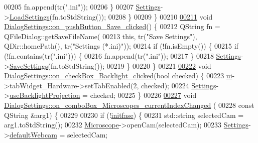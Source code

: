 \begin{DoxyCode}
00205       fn.append(tr(\textcolor{stringliteral}{".ini"}));
00206     \}
00207     \hyperlink{class_dialog_settings_ae6b9e42f9108f93c4964be28a7171648}{Settings}->\hyperlink{class_soil_analyzer_1_1_soil_settings_a438bf660eeb7a49a676eef5da129f8d5}{LoadSettings}(fn.toStdString());
00208   \}
00209 \}
00210 
\hypertarget{dialogsettings_8cpp_source_l00211}{}\hyperlink{class_dialog_settings_a2f04e1b1d30db8197db4de03bea63a87}{00211} \textcolor{keywordtype}{void} \hyperlink{class_dialog_settings_a2f04e1b1d30db8197db4de03bea63a87}{DialogSettings::on\_pushButton\_Save\_clicked}() \{
00212   QString fn = QFileDialog::getSaveFileName(
00213       \textcolor{keyword}{this}, tr(\textcolor{stringliteral}{"Save Settings"}), QDir::homePath(), tr(\textcolor{stringliteral}{"Settings (*.ini)"}));
00214   \textcolor{keywordflow}{if} (!fn.isEmpty()) \{
00215     \textcolor{keywordflow}{if} (!fn.contains(tr(\textcolor{stringliteral}{".ini"}))) \{
00216       fn.append(tr(\textcolor{stringliteral}{".ini"}));
00217     \}
00218     \hyperlink{class_dialog_settings_ae6b9e42f9108f93c4964be28a7171648}{Settings}->\hyperlink{class_soil_analyzer_1_1_soil_settings_ab211c361df454e8e1e29a4bddedeba81}{SaveSettings}(fn.toStdString());
00219   \}
00220 \}
00221 
\hypertarget{dialogsettings_8cpp_source_l00222}{}\hyperlink{class_dialog_settings_a32f4763290f97febfa34bcdcd2dc9432}{00222} \textcolor{keywordtype}{void} \hyperlink{class_dialog_settings_a32f4763290f97febfa34bcdcd2dc9432}{DialogSettings::on\_checkBox\_Backlight\_clicked}(\textcolor{keywordtype}{bool} 
      checked) \{
00223   \hyperlink{class_dialog_settings_a5b53d91a27cdf68f77e4bdd10b6a9bba}{ui}->tabWidget\_Hardware->setTabEnabled(2, checked);
00224   \hyperlink{class_dialog_settings_ae6b9e42f9108f93c4964be28a7171648}{Settings}->\hyperlink{class_soil_analyzer_1_1_soil_settings_a4945fc8b592a2585d3719175e3b80c88}{useBacklightProjection} = checked;
00225 \}
00226 
\hypertarget{dialogsettings_8cpp_source_l00227}{}\hyperlink{class_dialog_settings_adeb3fcea2cf71899e5f9dd184421c131}{00227} \textcolor{keywordtype}{void} \hyperlink{class_dialog_settings_adeb3fcea2cf71899e5f9dd184421c131}{DialogSettings::on\_comboBox\_Microscopes\_currentIndexChanged}
      (
00228     \textcolor{keyword}{const} QString &arg1) \{
00229 
00230   \textcolor{keywordflow}{if} (!\hyperlink{class_dialog_settings_aeff07458ed6d4469cc16f90971bc5083}{initfase}) \{
00231     std::string selectedCam = arg1.toStdString();
00232     \hyperlink{class_microscope}{Microscope}->openCam(selectedCam);
00233     \hyperlink{class_dialog_settings_ae6b9e42f9108f93c4964be28a7171648}{Settings}->\hyperlink{class_soil_analyzer_1_1_soil_settings_a8dbe6065562599e544b55fb49564fd2d}{defaultWebcam} = selectedCam;

\end{DoxyCode}
